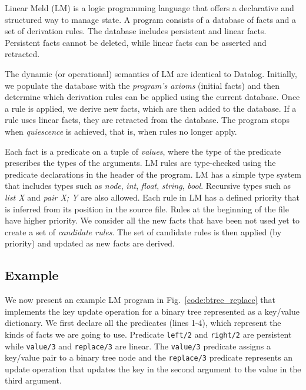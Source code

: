 \newcommand{\selector}[0]{[~S~\Rightarrow~y;~BE~] \lolli HE}
\newcommand{\comprehension}[0]{\{~\widehat{x};~BE;~SH~\}}
\newcommand{\aggregate}[0]{[~A~\Rightarrow~y;~\widehat{x};~BE;~SH_1;~SH_2~]}

Linear Meld (LM) is a logic programming language that offers a declarative and structured way to manage state.
A program consists of a database of facts and a set of derivation rules. The database includes persistent
and linear facts. Persistent facts cannot be deleted, while linear facts can be asserted and retracted.

The dynamic (or operational) semantics of LM are identical to Datalog.
Initially, we populate the database with the \emph{program's axioms} (initial facts) and then determine which derivation rules can be applied using the current database. Once a rule is applied, we derive new facts, which are then added to the database.
If a rule uses linear facts, they are retracted from the database.
The program stops when \emph{quiescence} is achieved, that is, when rules no longer apply.

Each fact is a predicate on a tuple of \emph{values}, where the type of the predicate prescribes the types of the arguments.
LM rules are type-checked using the predicate declarations in the header of the program. LM has a simple type system that includes types such as
\emph{node}, \emph{int}, \emph{float}, \emph{string}, \emph{bool}. Recursive types such as \emph{list X} and \emph{pair X; Y} are
also allowed.
Each rule in LM has a defined priority that is inferred from its position in the source file.
Rules at the beginning of the file have higher priority. We consider all
the new facts that have been not used yet to create a set of \emph{candidate rules}.
The set of candidate rules is then applied (by priority) and updated as new facts are derived.

\subsection{Example}

We now present an example LM program in Fig.~\ref{code:btree_replace} that implements the key update operation for a binary tree
represented as a key/value dictionary.
We first declare all the predicates (lines 1-4), which represent the kinds of facts we are going to use.
Predicate \texttt{left/2} and \texttt{right/2} are persistent while \texttt{value/3} and \texttt{replace/3} are linear.
The \texttt{value/3} predicate assigns a key/value pair to a binary tree node and the \texttt{replace/3} predicate
represents an update operation that updates the key in the second argument to the value in the third argument.

